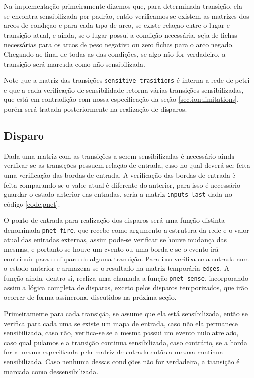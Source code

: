 Na implementação primeiramente dizemos que, para determinada transição, ela se encontra sensibilizada por padrão, então verificamos se existem as matrizes dos arcos de condição e para cada tipo de arco, se existe relação entre o lugar e transição atual, e ainda, se o lugar possui a condição necessária, seja de fichas necessárias para os arcos de peso negativo ou zero fichas para o arco negado. Chegando ao final de todas as das condições, se algo não for verdadeiro, a transição será marcada como não sensibilizada.

Note que a matriz das transições \lstinline{sensitive_trasitions} é interna a rede de petri e que a cada verificação de sensibilidade retorna várias transições sensibilizadas, que está em contradição com nossa especificação da seção \ref{section:limitations}, porém será tratada posteriormente na realização de disparos.   

\subsection{Disparo}

Dada uma matriz com as transições a serem sensibilizadas é necessário ainda verificar se as transições possuem relação de entrada, caso no qual deverá ser feita uma verificação das bordas de entrada. A verificação das bordas de entrada é feita comparando se o valor atual é diferente do anterior, para isso é necessário guardar o estado anterior das entradas, seria a matriz \lstinline{inputs_last} dada no código \ref{code:pnet}.

O ponto de entrada para realização dos disparos será uma função distinta denominada \lstinline{pnet_fire}, que recebe como argumento a estrutura da rede e o valor atual das entradas externas, assim pode-se verificar se houve mudança das mesmas, e portanto se houve um evento ou uma borda e se o evento irá contribuir para o disparo de alguma transição. Para isso verifica-se a entrada com o estado anterior e armazena se o resultado na matriz temporária \lstinline{edges}. A função ainda, dentro si, realiza uma chamada a função \lstinline{pnet_sense}, incorporando assim a lógica completa de disparos, exceto pelos disparos temporizados, que irão ocorrer de forma assíncrona, discutidos na próxima seção.



Primeiramente para cada transição, se assume que ela está sensibilizada, então se verifica para cada uma se existe um mapa de entrada, caso não ela permanece sensibilizada, caso não, verifica-se se a mesma possui um evento nulo atrelado, caso qual pulamos e a transição continua sensibilizada, caso contrário, se a borda for a mesma especificada pela matriz de entrada então a mesma continua sensibilizada. Caso nenhuma dessas condições não for verdadeira, a transição é marcada como dessensibilizada.   

